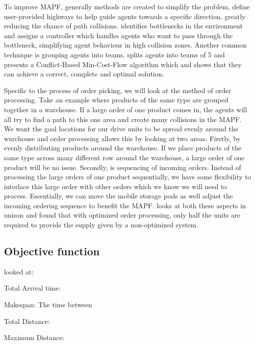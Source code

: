 \documentclass[a4paper,11pt]{article}
\begin{document}
To improve MAPF, generally methods are created to simplify the problem, \cite{cohen2016bounded} define user-provided highways to help guide agents towards a specific direction, greatly reducing the chance of path collisions. \cite{wilt2014spatially} identifies bottlenecks in the environment and assigns a controller which handles agents who want to pass through the bottleneck, simplifying agent behaviour in high collision zones. Another common technique is grouping agents into teams. \cite{ma2016optimal} splits agents into teams of 5 and presents a Conflict-Based Min-Cost-Flow algorithm which and shows that they can achieve a correct, complete and optimal solution.


Specific to the process of order picking, we will look at the method of order processing. Take an example where products of the same type are grouped together in a warehouse. If a large order of one product comes in, the agents will all try to find a path to this one area and create many collisions in the MAPF. We want the goal locations for our drive units to be spread evenly around the warehouse and order processing allows this by looking at two areas. Firstly, by evenly distributing products around the warehouse. If we place products of the same type across many different row around the warehouse, a large order of one product will be no issue. Secondly, is sequencing of incoming orders. Instead of processing the large orders of one product sequentially, we have some flexibility to interlace this large order with other orders which we know we will need to process. Essentially, we can move the mobile storage pods as well adjust the incoming ordering sequence to benefit the MAPF. \cite{boysen2017parts} looks at both these aspects in unison and found that with optimized order processing, only half the units are required to provide the supply given by a non-optimized system.

\subsection{Objective function}

\cite{yu2015optimal} looked at: 
\begin{compactenum}
	\item Total Arrival time: 
	\item Makespan: The time between 
	\item Total Distance: 
	\item Maximum Distance: 
\end{compactenum}
\end{document}
